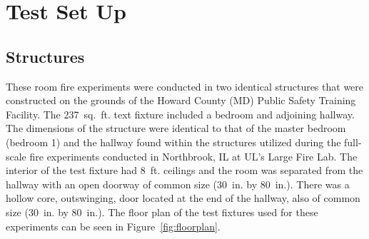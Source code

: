 \documentclass[12pt,oneside]{book}
\begin{document}
\begin{minipage}[t][9in][s]{6.25in}





\vfill


\titlesigs

\end{minipage}

\frontmatter

\chapter{Test Set Up}

\section{Structures}

These room fire experiments were conducted in two identical structures that were constructed on the grounds of the Howard County (MD) Public Safety Training Facility. The 237~sq.~ft. text fixture included a bedroom and adjoining hallway. The dimensions of the structure were identical to that of the master bedroom (bedroom 1) and the hallway found within the structures utilized during the full-scale fire experiments conducted in Northbrook, IL at UL's Large Fire Lab. The interior of the test fixture had 8~ft. ceilings and the room was separated from the hallway with an open doorway of common size (30~in. by 80~in.). There was a hollow core, outswinging, door located at the end of the hallway, also of common size (30~in. by 80~in.). The floor plan of the test fixtures used for these experiments can be seen in Figure~\ref{fig:floorplan}.
\end{document}
